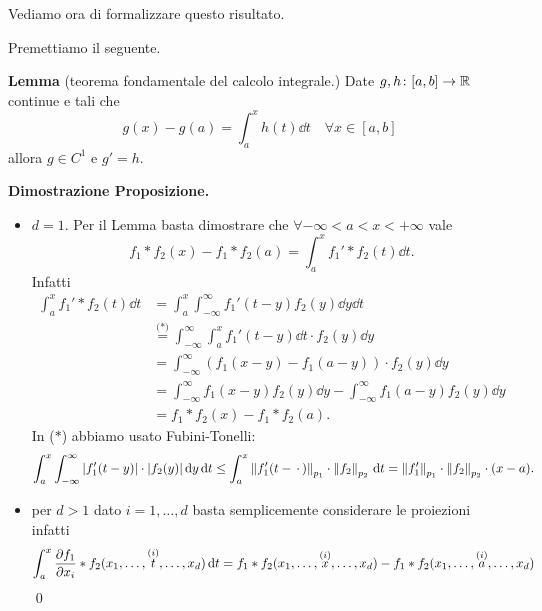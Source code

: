 Vediamo ora di formalizzare questo risultato.



Premettiamo il seguente.

\textbf{Lemma} (teorema fondamentale del calcolo integrale.) Date $g,h \colon [a,b] \to \mathbb R$ continue e tali che
$$
	g(x) - g(a) = \int_a^x h(t) \dd t \quad \forall x \in [a,b]
$$
allora $g \in C^1$ e $g' = h$.

\textbf{Dimostrazione Proposizione.}
\begin{itemize}
	\item $d = 1$. Per il Lemma basta dimostrare che $\forall -\infty < a < x < +\infty$ vale
	$$
		f_1 \ast f_2(x) - f_1 \ast f_2(a) = \int_a^x f_1' \ast f_2(t) \dd t.
	$$
	Infatti
		$$
		\begin{aligned}
			\int_a^x f_1' \ast f_2 (t) \dd t
			& = \int_a^x \int_{-\infty}^\infty f_1'(t - y) f_2(y) \dd y \dd t \\
			& \overset{\text{($*$)}}{=} \int_{-\infty}^\infty \int_a^x f_1'(t - y) \dd t \cdot f_2(y) \dd y \\
			& = \int_{-\infty}^\infty (f_1(x - y) - f_1(a - y)) \cdot f_2(y) \dd y \\
			& = \int_{-\infty}^\infty f_1(x - y) f_2(y) \dd y - \int_{-\infty}^\infty f_1(a - y) f_2(y) \dd y \\
			& = f_1 \ast f_2(x) - f_1 \ast f_2(a).
		\end{aligned}
		$$
		In ($*$) abbiamo usato Fubini-Tonelli:
		$$
			\int_a^x \int_{-\infty}^\infty |f_1'(t-y)| \cdot |f_2(y)| \,\mathrm{d} y \,\mathrm{d} t
			\leq \int_a^x \left\lVert f_1'(t - \,\cdot\,) \right\rVert_{p_1} \cdot \left\lVert f_2 \right\rVert_{p_2} \,\mathrm{d} t 
			= \left\lVert f_1' \right\rVert_{p_1} \cdot \left\lVert f_2 \right\rVert_{p_2} \cdot (x - a).
		$$

	\item
		per $d > 1$ dato $i = 1, \dots, d$ basta semplicemente considerare le proiezioni infatti
		$$
		\int_a^x \frac{\partial f_1}{\partial x_i} \ast f_2 (x_1, \dots, \overset{\text{($i$)}}{t}, \dots, x_d) \,\mathrm{d} t
		= f_1 \ast f_2 (x_1, \dots, \overset{\text{($i$)}}{x}, \dots, x_d) - f_1 \ast f_2 (x_1, \dots, \overset{\text{($i$)}}{a}, \dots, x_d)
		$$
		\qed
\end{itemize}

